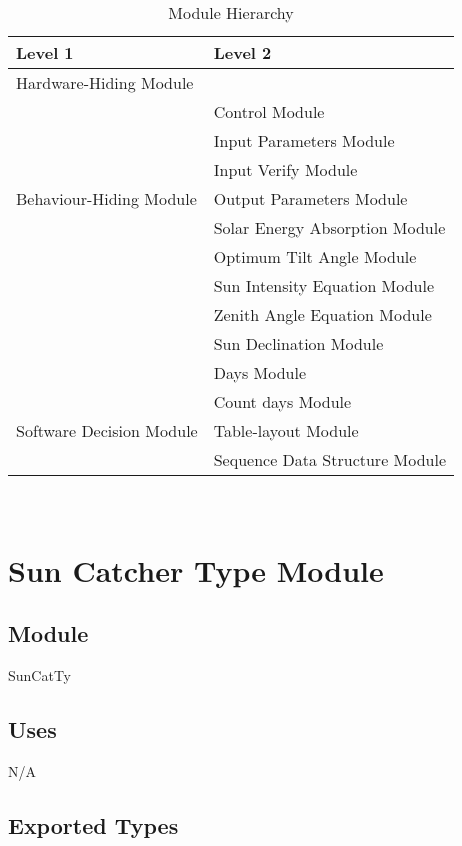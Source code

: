 \documentclass[12pt, titlepage]{article}
\begin{document}
\begin{table}[h!]
\centering
\begin{tabular}{p{} p{}}
\toprule
\textbf{Level 1} & \textbf{Level 2}\\
\midrule

{Hardware-Hiding Module} & ~ \\
\midrule

\multirow{7}{0.3\textwidth}{Behaviour-Hiding
 Module}& Control Module\\
& Input Parameters Module\\
& Input Verify Module\\
& Output Parameters Module\\
& Solar Energy Absorption Module\\
& Optimum Tilt Angle Module\\
& Sun Intensity Equation Module\\
& Zenith Angle Equation Module\\
& Sun Declination Module\\
& Days Module\\
\midrule

\multirow{3}{0.3\textwidth}{Software Decision Module} 
& Count days Module\\
& Table-layout Module\\
& Sequence Data Structure Module\\
\bottomrule

\end{tabular}
\caption{Module Hierarchy}
\label{TblMH}
\end{table}

\newpage
~\newpage

\section{Sun Catcher Type Module} \label{ModuleSCTM} 

\subsection{Module}
SunCatTy

\subsection{Uses}

N/A\\

\subsection{Exported Types}
\end{document}
